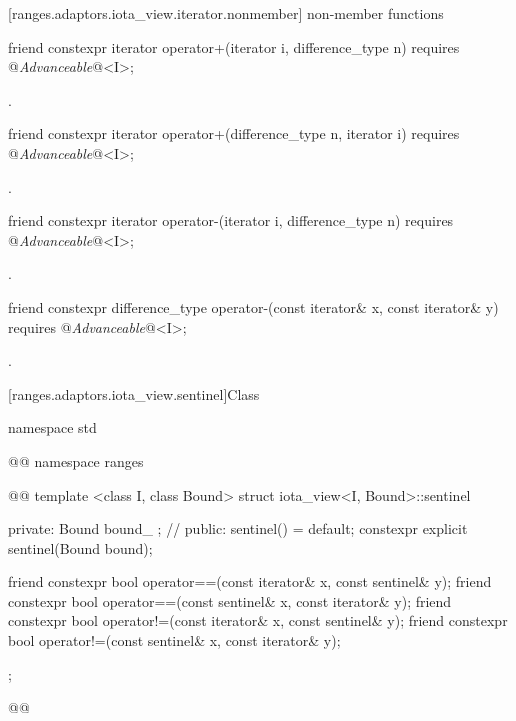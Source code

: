 [ranges.adaptors.iota_view.iterator.nonmember]{ non-member functions}

\begin{itemdecl}
friend constexpr iterator operator+(iterator i, difference_type n)
  requires @\textit{Advanceable}@<I>;
\end{itemdecl}

\begin{itemdescr}
\pnum
\returns {}.
\end{itemdescr}

\begin{itemdecl}
friend constexpr iterator operator+(difference_type n, iterator i)
  requires @\textit{Advanceable}@<I>;
\end{itemdecl}

\begin{itemdescr}
\pnum
\returns {}.
\end{itemdescr}

\begin{itemdecl}
friend constexpr iterator operator-(iterator i, difference_type n)
  requires @\textit{Advanceable}@<I>;
\end{itemdecl}

\begin{itemdescr}
\pnum
\returns {}.
\end{itemdescr}

\begin{itemdecl}
friend constexpr difference_type operator-(const iterator& x, const iterator& y)
  requires @\textit{Advanceable}@<I>;
\end{itemdecl}

\begin{itemdescr}
\pnum
\returns {}.
\end{itemdescr}

[ranges.adaptors.iota_view.sentinel]{Class }

\begin{codeblock}
namespace std { @@ namespace ranges { @@
  template <class I, class Bound>
  struct iota_view<I, Bound>::sentinel {
  private:
    Bound bound_ {}; // \expos
  public:
    sentinel() = default;
    constexpr explicit sentinel(Bound bound);

    friend constexpr bool operator==(const iterator& x, const sentinel& y);
    friend constexpr bool operator==(const sentinel& x, const iterator& y);
    friend constexpr bool operator!=(const iterator& x, const sentinel& y);
    friend constexpr bool operator!=(const sentinel& x, const iterator& y);
  };
}}@\removed{\}\}}@
\end{codeblock}

